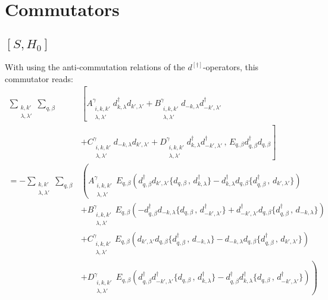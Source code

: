 \newpage
\section{Commutators}
\subsection{$[S,H_0]$} \label{app:commutator1}
With using the anti-commutation relations of the $d^{[\dag]}$-operators, this commutator reads:
\begin{align}\nonumber
    \sum_{\substack{k,k'\\ \lambda, \lambda' }} \sum_{q,\beta} &\left[  A_{\substack{i,k,k'\\ \lambda, \lambda'}}^{ \gamma} d^{\dag}_{k,\lambda} d_{k', \lambda'}+ B_{\substack{i,k,k'\\ \lambda, \lambda'}}^{ \gamma} d_{-k,\lambda} d^{\dag}_{-k', \lambda'} \right. \\
    & \left. + C_{\substack{i,k,k'\\ \lambda, \lambda'}}^{ \gamma} d_{-k,\lambda} d_{k', \lambda'}+ D_{\substack{i,k,k'\\ \lambda, \lambda'}}^{ \gamma} d^{\dag}_{k,\lambda} d^{\dag}_{-k', \lambda'}\, , \, E_{q,\beta} d^{\dag}_{q,\beta} d_{q,\beta} \right] \\ \nonumber
    =  - \sum_{\substack{k,k'\\ \lambda, \lambda' }} \sum_{q,\beta} 
    &\left( A_{\substack{i,k,k'\\ \lambda, \lambda'}}^{ \gamma}\,E_{q,\beta} \left( d^{\dag}_{q,\beta} d_{k', \lambda'} \{ d_{q,\beta}\, , \, d^{\dag}_{k, \lambda} \}- d^{\dag}_{k,\lambda} d_{q, \beta} \{ d^{\dag}_{q,\beta}\, , \, d_{k', \lambda'} \}  \right) \right. \\ \nonumber
    &\left. + B_{\substack{i,k,k'\\ \lambda, \lambda'}}^{ \gamma}\,E_{q,\beta} \left( -d^{\dag}_{q,\beta} d_{-k, \lambda} \{ d_{q,\beta}\, , \, d^{\dag}_{-k', \lambda'} \} + d^{\dag}_{-k',\lambda'} d_{q, \beta} \{ d^{\dag}_{q,\beta}\, , \, d_{-k, \lambda} \}  \right) \right.\\ \nonumber
    &\left. + C_{\substack{i,k,k'\\ \lambda, \lambda'}}^{ \gamma}\,E_{q,\beta} \left( d_{k',\lambda'} d_{q, \beta} \{ d^{\dag}_{q,\beta}\, , \, d_{-k, \lambda} \} - d_{-k,\lambda} d_{q, \beta} \{ d^{\dag}_{q,\beta}\, , \, d_{k', \lambda'} \}  \right)\right.\\ \nonumber
    &\left. + D_{\substack{i,k,k'\\ \lambda, \lambda'}}^{ \gamma}\,E_{q,\beta} \left( d^{\dag}_{q,\beta} d^{\dag}_{-k', \lambda'} \{ d_{q,\beta}\, , \, d^{\dag}_{k, \lambda} \} - d^{\dag}_{q,\beta} d^{\dag}_{k, \lambda} \{ d_{q,\beta}\, , \, d^{\dag}_{-k', \lambda'} \}  \right) \right) \\ \nonumber

\end{align}
